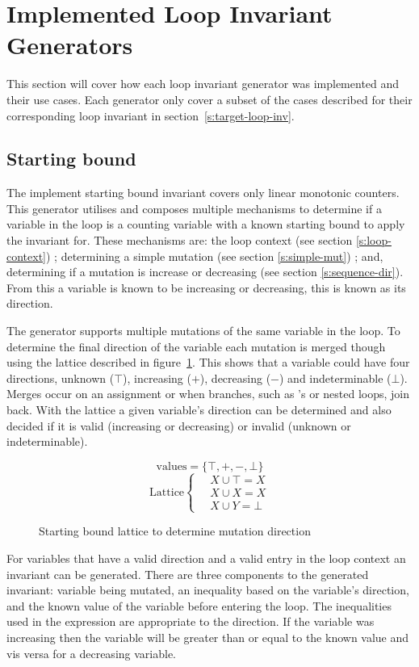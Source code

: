 \section{Implemented Loop Invariant Generators}

This section will cover how each loop invariant generator was implemented and their use cases.
Each generator only cover a subset of the cases described 
for their corresponding loop invariant in section~\ref{s:target-loop-inv}.


\subsection{Starting bound}

The implement starting bound invariant covers only linear monotonic counters.
This generator utilises and composes multiple mechanisms to determine 
if a variable in the
loop is a counting variable with a known starting bound to apply the invariant for.
These mechanisms are: the loop context (see section \ref{s:loop-context}) ;
determining a simple mutation (see section \ref{s:simple-mut}) ; and,
determining if a mutation is increase or decreasing (see section \ref{s:sequence-dir}).
From this a variable is known to be increasing or decreasing, this is known as its direction.

The generator supports multiple mutations of the same variable in the loop.
To determine the final direction of the variable each mutation is merged though
using the lattice described in figure~\ref{eq:start-lattice}.
This shows that a variable could have four directions, unknown ($\top$),
increasing ($+$), decreasing ($-$) and indeterminable ($\bot$).
Merges occur on an assignment or when branches, 
such as 's or nested loops, join back.
With the lattice a given variable's direction can be determined and also
decided if it is valid (increasing or decreasing) or invalid (unknown or indeterminable).

\begin{figure}
$$\text{values} = \{ \top, +, -, \bot \}$$
\[
\text{Lattice} \begin{cases*}
\quad X \cup \top = X \\
\quad X \cup X = X \\
\quad X \cup Y = \bot
\end{cases*}
\]
\caption{Starting bound lattice to determine mutation direction}
\label{eq:start-lattice}
\end{figure}

For variables that have a valid direction and a valid entry in the loop context an invariant
can be generated.
There are three components to the generated invariant: variable being mutated, an inequality based
on the variable's direction, and the known value of the variable before entering the loop.
The inequalities used in the expression are appropriate to the direction. 
If the variable was increasing then the variable will be greater than or equal to the known value
and vis versa for a decreasing variable.

